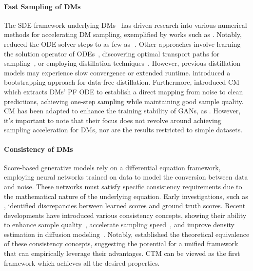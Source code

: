 \documentclass{article} \usepackage{iclr2024_coNFErence,times}
\theoremstyle{definition}
\theoremstyle{remark}
\begin{document}
\paragraph{Fast Sampling of DMs} The SDE framework underlying DMs~\citep{song2020score} has driven research into various numerical methods for accelerating DM sampling, exemplified by works such as \citep{song2020denoising,zhang2022fast,lu2022dpm}. Notably, \citep{lu2022dpm} reduced the ODE solver steps to as few as -. Other approaches involve learning the solution operator of ODEs~\citep{zheng2023fast}, discovering optimal transport paths for sampling~\citep{liu2022flow}, or employing distillation techniques~\citep{luhman2021knowledge,salimans2021progressive,berthelot2023tract,shao2023catch}. However, previous distillation models may experience slow convergence or extended runtime.
\citet{gu2023boot} introduced a bootstrapping approach for data-free distillation. Furthermore, \citet{song2023consistency} introduced CM which extracts DMs' PF ODE to establish a direct mapping from noise to clean predictions, achieving one-step sampling while maintaining good sample quality. CM has been adapted to enhance the training stability of GANs, as \citep{lu2023cm}. However, it's important to note that their focus does not revolve around achieving sampling acceleration for DMs, nor are the results restricted to simple datasets.


\paragraph{Consistency of DMs} Score-based generative models rely on a differential equation framework, employing neural networks trained on data to model the conversion between data and noise. These networks must satisfy specific consistency requirements due to the mathematical nature of the underlying equation. Early investigations, such as \citep{kim2022soft}, identified discrepancies between learned scores and ground truth scores. Recent developments have introduced various consistency concepts, showing their ability to enhance sample quality~\citep{daras2023consistent,li2023diffusion}, accelerate sampling speed~\citep{song2023consistency}, and improve density estimation in diffusion modeling~\citep{lai2023fp}. Notably, \citet{lai2023equivalence} established the theoretical equivalence of these consistency concepts, suggesting the potential for a unified framework that can empirically leverage their advantages. CTM can be viewed as the first framework which achieves all the desired properties.
\end{document}
